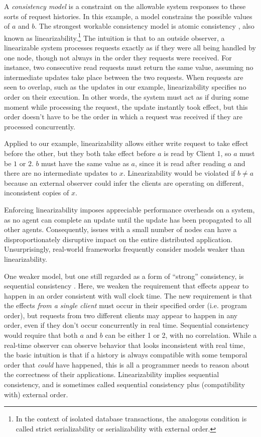 A \emph{consistency model} is a constraint on the allowable system
responses to these sorts of request histories. In this example, a
model constrains the possible values of $a$ and $b$. The strongest
workable consistency model is atomic consistency \cite{}, also known
as linearizability.\footnote{In the context of isolated database
transactions, the analogous condition is called strict serializability
or serializability with external order.} The intuition is that to an
outside observer, a linearizable system processes requests exactly as
if they were all being handled by one node, though not always in the
order they requests were received. For instance, two consecutive read
requests must return the same value, assuming no intermediate updates
take place between the two requests. When requests are seen to
overlap, such as the updates in our example, linearizability specifies
no order on their execution. In other words, the system must act as if
during some moment while processing the request, the update instantly
took effect, but this order doesn't have to be the order in which a
request was received if they are processed concurrently.

Applied to our example, linearizability allows either write request to
take effect before the other, but they both take effect before $a$ is
read by Client 1, so $a$ must be $1$ or $2$. $b$ must have the same
value as $a$, since it is read after reading $a$ and there are no
intermediate updates to $x$. Linearizability would be violated if $b
\neq a$ because an external observer could infer the clients are
operating on different, inconsistent copies of $x$.

Enforcing linearizability imposes appreciable performance overheads on
a system, as no agent can complete an update until the update has been
propagated to all other agents. Consequently, issues with a small
number of nodes can have a disproportionately disruptive impact on the
entire distributed application. Unsurprisingly, real-world frameworks
frequently consider models weaker than linearizability.

One weaker model, but one still regarded as a form of ``strong''
consistency, is sequential consistency \cite{}. Here, we weaken the
requirement that effects appear to happen in an order consistent with
wall clock time. The new requirement is that the effects \emph{from a
single client} must occur in their specified order (i.e. program
order), but requests from two different clients may appear to happen
in any order, even if they don't occur concurrently in real
time. Sequential consistency would require that both $a$ and $b$ can
be either 1 or 2, with no correlation. While a real-time observer can
observe behavior that looks inconsistent with real time, the basic
intuition is that if a history is always compatible with some temporal
order that \emph{could} have happened, this is all a programmer needs
to reason about the correctness of their applications. Linearizability
implies sequential consistency, and is sometimes called sequential
consistency plus (compatibility with) external order.

